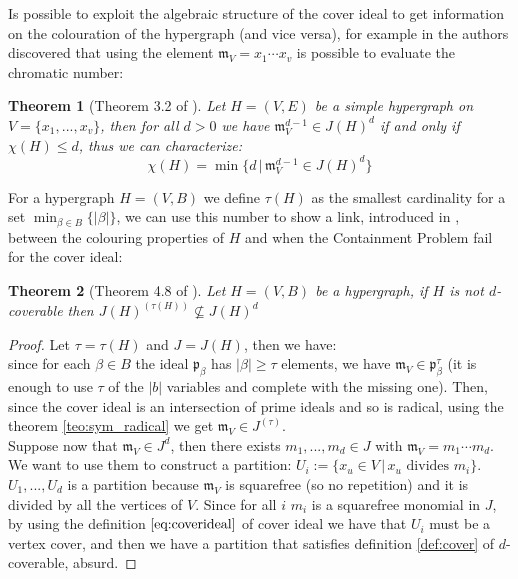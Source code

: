 \documentclass[notitlepage, a4]{book}
\theoremstyle{plain}
\newtheorem{teo}{Theorem}[section]
\theoremstyle{remark}
\theoremstyle{definition}
\newcommand{\p}{\mathfrak{p}}
\newcommand{\mm}{\mathfrak{m}}
\begin{document}
Is possible to exploit the algebraic structure of the cover ideal to get information on the colouration of the hypergraph (and vice versa), for example in \cite{Fran10Colourings} the authors discovered that using the element $  \mm_V = x_1 \cdots x_v  $ is possible to evaluate the chromatic number:

\begin{teo}[Theorem 3.2 of \cite{Fran10Colourings}] \label{teo:col:chi}
Let $ H = (V,E) $ be a simple hypergraph on $ V = \{ x_1 , ... , x_v\} $, then for all $ d >0 $ we have $ \mm_V^{d-1} \in J(H)^d $ if and only if $ \chi(H) \leq d $, thus we can characterize:
\begin{equation}\label{eq:col:chi}
 \chi(H)   = \min \{ d \,|\, \mm_V^{d-1} \in J(H)^d\}
 \end{equation}
\end{teo}



For a hypergraph $ H = (V,B) $ we define $ \tau (H) $ as the smallest cardinality for a set $ \min_{\beta \in B} \{ |\beta |\}$, we can use this number to show a link, introduced in \cite{Bal21Steiner}, between the colouring properties of $ H $ and when the Containment Problem fail for the cover ideal:

\begin{teo}[Theorem 4.8 of \cite{Bal21Steiner}] \label{teo:col:cont}
Let $ H = (V,B) $ be a hypergraph, if $ H $ is not $ d $-coverable then $ J(H)^{(\tau(H))} \not \subseteq J(H)^d $
\end{teo}

\begin{proof}
Let $\tau = \tau (H)$ and $ J = J(H) $, then we have:\\
since for each $ \beta \in B $ the ideal $ \p_\beta $ has $ |\beta | \geq \tau $ elements, we have $ \mm_V \in \p_\beta^\tau $ (it is enough to use $\tau$ of the $ |b| $ variables and complete with the missing one). Then, since the cover ideal is an intersection of prime ideals and so is radical, using the theorem \ref{teo:sym_radical} we get $ \mm_V \in J^{(\tau)} $.\\
Suppose now that $ \mm_V \in J^d $, then there exists $ m_1 , ... , m_d \in J $ with $ \mm_V = m_1 \cdots m_d $. We want to use them to construct a partition: $ U_i := \{ x_u \in V \,|\, x_u \text{ divides } m_i\} $. $ U_1 , ... ,U_d $ is a partition because $ \mm_V $ is squarefree (so no repetition) and it is divided by all the vertices of $ V $. Since for all $ i $  $ m_i $ is a squarefree monomial in $ J $, by using the definition $ \ref{eq:coverideal} $ of cover ideal we have that $ U_i $ must be a vertex cover, and then we have a partition that satisfies definition \ref{def:cover} of $ d $-coverable, absurd. 
\end{proof}
\end{document}
